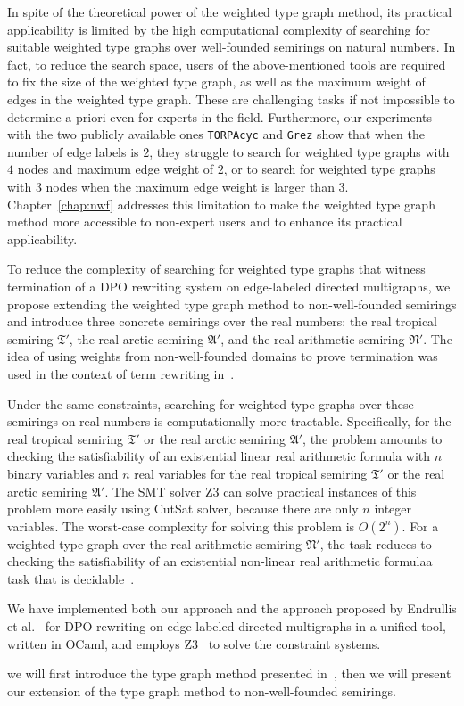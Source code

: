     In spite of the theoretical power of the weighted type graph method, its practical applicability is limited by the high computational complexity of searching for suitable weighted type graphs over well-founded semirings on 
    natural numbers. In fact, to reduce the search space, users of the above-mentioned tools are required
     to fix the size of the weighted type graph, as well as the maximum weight of edges in the weighted type graph. These are challenging tasks if not impossible to determine a priori even for experts in the field. 
    Furthermore, our experiments with the two publicly available ones \texttt{TORPAcyc} and \texttt{Grez} show that when the number of edge labels is $2$, they struggle to search for weighted type graphs with $4$ nodes and maximum edge weight of $2$, or to search for weighted type graphs with $3$ nodes when the maximum edge weight is larger than $3$. 
   Chapter~\ref{chap:nwf} addresses this limitation to make the weighted type graph method more accessible to non-expert users and to enhance its practical applicability.

To reduce the complexity of searching for weighted type graphs that witness termination of a DPO rewriting system on edge-labeled directed multigraphs, we propose extending the weighted type graph method to non-well-founded semirings and introduce three concrete semirings over the real numbers: the real tropical semiring $\mathfrak{T}'$, the real arctic semiring $\mathfrak{A}'$, and the real arithmetic semiring $\mathfrak{N}'$. The idea of using weights from non-well-founded domains to prove termination was used in the context of term rewriting in~\cite{lucas2006relative}.

Under the same constraints, searching for weighted type graphs over these semirings on real numbers is computationally more tractable. Specifically,
for the real tropical semiring $\mathfrak{T}'$ or the real arctic semiring $\mathfrak{A}'$, the problem amounts to checking the satisfiability of an
existential linear real arithmetic formula with $n$ binary variables and $n$ real variables for the real tropical semiring $\mathfrak{T}'$ or the real arctic semiring $\mathfrak{A}'$.
The SMT solver Z3 can solve practical instances of this problem more easily using CutSat solver, because there are only $n$ integer variables. The worst-case complexity for solving this problem is $O(2^n)$.
For a weighted type graph over the real arithmetic semiring $\mathfrak{N}'$, the task reduces to checking the satisfiability of 
an existential non-linear real arithmetic formula\textemdash a task that is decidable~\cite{collins1974quantifier,z3realarithmetic}.

We have implemented both our approach and the approach proposed by Endrullis et al.~\cite{endrullis2024generalized_arxiv_v2} for DPO rewriting on edge-labeled directed multigraphs in a unified tool, written in OCaml, and employs Z3~\cite{de2008z3} to solve the constraint systems.

we will first introduce the type graph method presented in~\cite{endrullis2024generalized_icgt}, then we will present our extension of the type graph method to non-well-founded semirings.